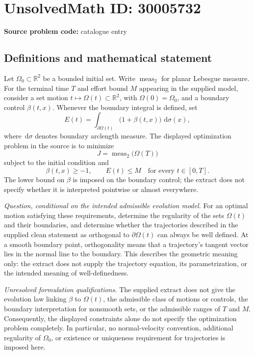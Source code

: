 \documentclass[11pt]{article}
\newcommand{\R}{\mathbb{R}}
\newcommand{\dd}{\,\mathrm{d}}
\begin{document}
\section*{UnsolvedMath ID: 30005732}
\textbf{Source problem code:} catalogue entry
\subsection{Definitions and mathematical statement}
Let \(\Omega_0\subset\R^2\) be a bounded initial set. Write \(\operatorname{meas}_2\) for planar Lebesgue measure. For the terminal time \(T\) and effort bound \(M\) appearing in the supplied model, consider a set motion \(t\mapsto\Omega(t)\subset\R^2\), with \(\Omega(0)=\Omega_0\), and a boundary control \(\beta(t,x)\). Whenever the boundary integral is defined, set
\[
E(t)=\int_{\partial\Omega(t)}\bigl(1+\beta(t,x)\bigr)\,\dd\sigma(x),
\]
where \(\dd\sigma\) denotes boundary arclength measure. The displayed optimization problem in the source is to minimize
\[
J=\operatorname{meas}_2\bigl(\Omega(T)\bigr)
\]
subject to the initial condition and
\[
\beta(t,x)\geq -1,
\qquad
E(t)\leq M\quad\text{for every }t\in[0,T].
\]
The lower bound on \(\beta\) is imposed on the boundary control; the extract does not specify whether it is interpreted pointwise or almost everywhere.

\emph{Question, conditional on the intended admissible evolution model.} For an optimal motion satisfying these requirements, determine the regularity of the sets \(\Omega(t)\) and their boundaries, and determine whether the trajectories described in the supplied clean statement as orthogonal to \(\partial\Omega(t)\) can always be well defined. At a smooth boundary point, orthogonality means that a trajectory's tangent vector lies in the normal line to the boundary. This describes the geometric meaning only: the extract does not supply the trajectory equation, its parametrization, or the intended meaning of well-definedness.

\emph{Unresolved formulation qualifications.} The supplied extract does not give the evolution law linking \(\beta\) to \(\Omega(t)\), the admissible class of motions or controls, the boundary interpretation for nonsmooth sets, or the admissible ranges of \(T\) and \(M\). Consequently, the displayed constraints alone do not specify the optimization problem completely. In particular, no normal-velocity convention, additional regularity of \(\Omega_0\), or existence or uniqueness requirement for trajectories is imposed here.
\end{document}
